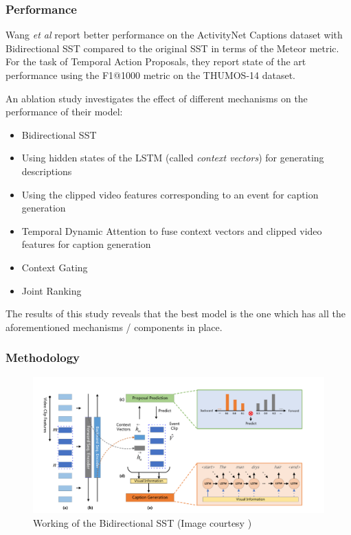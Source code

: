 \subsubsection{Performance}
\par 
Wang \textit{et al} report better performance on the ActivityNet Captions dataset with 
Bidirectional SST compared to the original SST in terms of the Meteor metric. For the task 
of Temporal Action Proposals, they report state of the art performance using the F1@1000 
metric on the THUMOS-14 dataset.
\par 
An ablation study investigates the effect of different mechanisms on the performance of their model:
\begin{itemize}
\item Bidirectional SST
\item Using hidden states of the LSTM (called \textit{context vectors}) for generating 
descriptions
\item Using the clipped video features corresponding to an event for caption generation
\item Temporal Dynamic Attention to fuse context vectors and clipped video features for 
caption generation
\item Context Gating
\item Joint Ranking
\end{itemize}
The results of this study reveals that the best model is the one which has all the 
aforementioned mechanisms / components in place.

\subsubsection{Methodology}

\begin{figure}[h]
	\includegraphics[width=\linewidth]{assets/img/bi-sst-architecture.png}
	\caption{Working of the Bidirectional SST (Image courtesy \cite{wang2018bidirectional})}
\end{figure}

